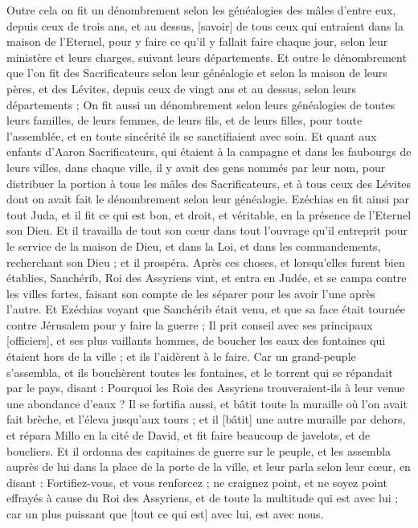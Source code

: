 \begin{multicols}{2}
Outre cela on fit un dénombrement selon les généalogies des mâles d'entre eux, depuis ceux de trois ans, et au dessus, [savoir] de tous ceux qui entraient dans la maison de l'Eternel, pour y faire ce qu'il y fallait faire chaque jour, selon leur ministère et leurs charges, suivant leurs départements.
Et outre le dénombrement que l'on fit des Sacrificateurs selon leur généalogie et selon la maison de leurs pères, et des Lévites, depuis ceux de vingt ans et au dessus, selon leurs départements ;
On fit aussi un dénombrement selon leurs généalogies de toutes leurs familles, de leurs femmes, de leurs fils, et de leurs filles, pour toute l'assemblée, et en toute sincérité ils se sanctifiaient avec soin.
Et quant aux enfants d'Aaron Sacrificateurs, qui étaient à la campagne et dans les faubourgs de leurs villes, dans chaque ville, il y avait des gens nommés par leur nom, pour distribuer la portion à tous les mâles des Sacrificateurs, et à tous ceux des Lévites dont on avait fait le dénombrement selon leur généalogie.
Ezéchias en fit ainsi par tout Juda, et il fit ce qui est bon, et droit, et véritable, en la présence de l'Eternel son Dieu.
Et il travailla de tout son cœur dans tout l'ouvrage qu'il entreprit pour le service de la maison de Dieu, et dans la Loi, et dans les commandements, recherchant son Dieu ; et il prospéra.
\VerseOne{}Après ces choses, et lorsqu'elles furent bien établies, Sanchérib, Roi des Assyriens vint, et entra en Judée, et se campa contre les villes fortes, faisant son compte de les séparer pour les avoir l'une après l'autre.
Et Ezéchias voyant que Sanchérib était venu, et que sa face était tournée contre Jérusalem pour y faire la guerre ;
Il prit conseil avec ses principaux [officiers], et ses plus vaillants hommes, de boucher les eaux des fontaines qui étaient hors de la ville ; et ils l'aidèrent à le faire.
Car un grand-peuple s'assembla, et ils bouchèrent toutes les fontaines, et le torrent qui se répandait par le pays, disant : Pourquoi les Rois des Assyriens trouveraient-ils à leur venue une abondance d'eaux ?
Il se fortifia aussi, et bâtit toute la muraille où l'on avait fait brèche, et l'éleva jusqu'aux tours ; et il [bâtit] une autre muraille par dehors, et répara Millo en la cité de David, et fit faire beaucoup de javelots, et de boucliers.
Et il ordonna des capitaines de guerre sur le peuple, et les assembla auprès de lui dans la place de la porte de la ville, et leur parla selon leur cœur, en disant :
Fortifiez-vous, et vous renforcez ; ne craignez point, et ne soyez point effrayés à cause du Roi des Assyriens, et de toute la multitude qui est avec lui ; car un plus puissant que [tout ce qui est] avec lui, est avec nous.

\end{multicols}
